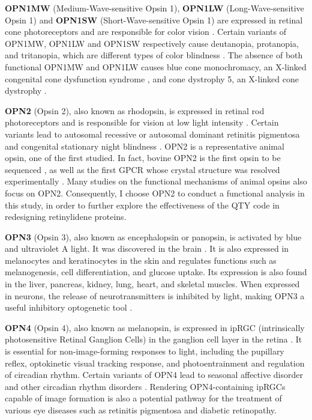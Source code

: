 \documentclass[fleqn, 10pt]{manuscript}
\begin{document}
\textbf{OPN1MW} (Medium-Wave-sensitive Opsin 1), \textbf{OPN1LW} (Long-Wave-sensitive Opsin 1) and \textbf{OPN1SW} (Short-Wave-sensitive Opsin 1) are expressed in retinal cone photoreceptors and are responsible for color vision \citep{Bowmaker_1980}. Certain variants of OPN1MW, OPN1LW and OPN1SW respectively cause deutanopia, protanopia, and tritanopia, which are different types of color blindness \citep{Ueyama_2002, Baraas_2012}. The absence of both functional OPN1MW and OPN1LW causes blue cone monochromacy, an X-linked congenital cone dysfunction syndrome \citep{Wissinger_2022}, and cone dystrophy 5, an X-linked cone dystrophy \citep{Gardner_2010}. 

\textbf{OPN2} (Opsin 2), also known as rhodopsin, is expressed in retinal rod photoreceptors and is responsible for vision at low light intensity \citep{Hubbard_1958}. Certain variants lead to autosomal recessive or autosomal dominant retinitis pigmentosa and congenital stationary night blindness \citep{Fanelli_2021}. OPN2 is a representative animal opsin, one of the first studied. In fact, bovine OPN2 is the first opsin to be sequenced \citep{Nathans_1984}, as well as the first GPCR whose crystal structure was resolved experimentally \citep{Palczeski_2000}. Many studies on the functional mechanisms of animal opsins also focus on OPN2. Consequently, I choose OPN2 to conduct a functional analysis in this study, in order to further explore the effectiveness of the QTY code in redesigning retinylidene proteins. 

\textbf{OPN3} (Opsin 3), also known as encephalopsin or panopsin, is activated by blue and ultraviolet A light. It was discovered in the brain \citep{Blackshaw_1999}. It is also expressed in melanocytes and keratinocytes in the skin and regulates functions such as melanogenesis, cell differentiation, and glucose uptake. Its expression is also found in the liver, pancreas, kidney, lung, heart, and skeletal muscles. When expressed in neurons, the release of neurotransmitters is inhibited by light, making OPN3 a useful inhibitory optogenetic tool \citep{Copits_2021}. 

\textbf{OPN4} (Opsin 4), also known as melanopsin, is expressed in ipRGC (intrinsically photosensitive Retinal Ganglion Cells) in the ganglion cell layer in the retina \citep{Provencio_1998}. It is essential for non-image-forming responses to light, including the pupillary reflex, optokinetic visual tracking response, and photoentrainment and regulation of circadian rhythm. Certain variants of OPN4 lead to seasonal affective disorder and other circadian rhythm disorders \citep{Berson_2002}. Rendering OPN4-containing ipRGCs capable of image formation is also a potential pathway for the treatment of various eye diseases such as retinitis pigmentosa and diabetic retinopathy. 
\end{document}
